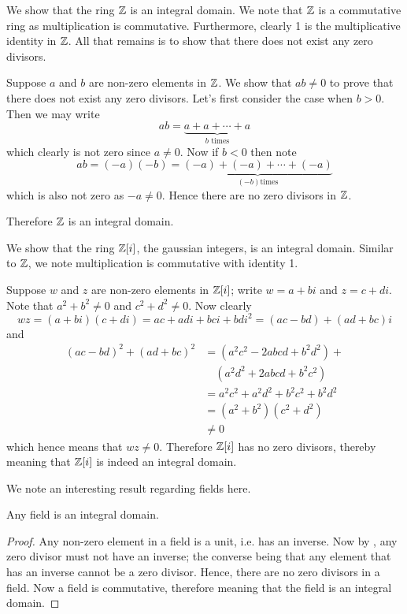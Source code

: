 \begin{example}
    We show that the ring $\mathbb{Z}$ is an integral domain. We note that $\mathbb{Z}$ is a commutative ring as multiplication is commutative. Furthermore, clearly 1 is the multiplicative identity in $\mathbb{Z}$. All that remains is to show that there does not exist any zero divisors.

    Suppose $a$ and $b$ are non-zero elements in $\mathbb{Z}$. We show that $ab \neq 0$ to prove that there does not exist any zero divisors. Let's first consider the case when $b > 0$. Then we may write
    \[
        ab = \underbrace{a + a + \cdots + a}_{b \text{ times}}
    \]
    which clearly is not zero since $a \neq 0$. Now if $b < 0$ then note
    \[
        ab = (-a)(-b) = \underbrace{(-a) + (-a) + \cdots + (-a)}_{(-b) \text{times}}
    \]
    which is also not zero as $-a \neq 0$. Hence there are no zero divisors in $\mathbb{Z}$.

    Therefore $\mathbb{Z}$ is an integral domain.
\end{example}
\begin{example}
    We show that the ring $\mathbb{Z}[i]$, the gaussian integers, is an integral domain. Similar to $\mathbb{Z}$, we note multiplication is commutative with identity 1.

    Suppose $w$ and $z$ are non-zero elements in $\mathbb{Z}[i]$; write $w = a+bi$ and $z = c+di$. Note that $a^2+b^2 \neq 0$ and $c^2 + d^2 \neq 0$. Now clearly
    \[
        wz = (a+bi)(c+di) = ac+adi+bci+bdi^2 = (ac-bd) + (ad+bc)i
    \]
    and
    \begin{align*}
        (ac-bd)^2 + (ad+bc)^2 &= (a^2c^2 - 2abcd + b^2d^2) +\\
        &\quad(a^2d^2 + 2abcd + b^2c^2)\\
        &= a^2c^2 + a^2d^2 + b^2c^2 + b^2d^2\\
        &= (a^2 + b^2)(c^2 + d^2)\\
        &\neq 0
    \end{align*}
    which hence means that $wz \neq 0$. Therefore $\mathbb{Z}[i]$ has no zero divisors, thereby meaning that $\mathbb{Z}[i]$ is indeed an integral domain.
\end{example}

We note an interesting result regarding fields here.
\begin{proposition}\label{prop-field-is-integral-domain}
    Any field is an integral domain.
\end{proposition}
\begin{proof}
    Any non-zero element in a field is a unit, i.e. has an inverse. Now by , any zero divisor must not have an inverse; the converse being that any element that has an inverse cannot be a zero divisor. Hence, there are no zero divisors in a field. Now a field is commutative, therefore meaning that the field is an integral domain.
\end{proof}

